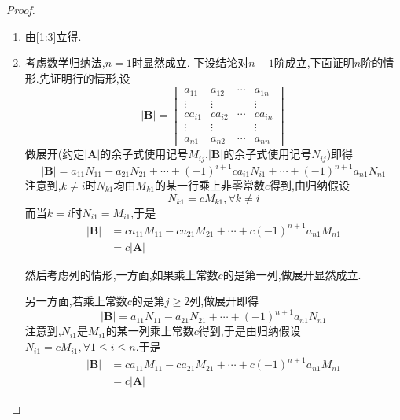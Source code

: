 {\begin{proof}
\begin{enumerate}[label = {\textup{(\arabic*)}}]
                  因为$\left|\bm{A}\right|$是下三角行列式即$a_{ij}=0,\forall i<j$,所以$M_{k1},\forall 1\leqslant k\leqslant n$均是下三角行列式并且断言$k\geqslant 2$时$M_{k1}$必定有零主对角元.事实上,$b_{k-1,k-1}=a_{k-1,k}=0$即得.于是由归纳假设$M_{k1}=0,\forall k\geqslant 2,M_{11}=a_{22}\cdots a_{nn}\Longrightarrow \left|\bm{A}\right|=a_{11}a_{22}\cdots a_{nn}.$证毕.
            \item 由\ref{1:3}立得.
            \item 考虑数学归纳法,$n=1$时显然成立.
                  下设结论对$n-1$阶成立,下面证明$n$阶的情形.先证明行的情形,设
                  \[
                      \left|\bm{B}\right|=\begin{vmatrix}
                          a_{11}  & a_{12}  & \cdots & a_{1n}  \\
                          \vdots  & \vdots  &        & \vdots  \\
                          ca_{i1} & ca_{i2} & \cdots & ca_{in} \\
                          \vdots  & \vdots  &        & \vdots  \\
                          a_{n1}  & a_{n2}  & \cdots & a_{nn}
                      \end{vmatrix}
                  \]做展开(约定$\left|\bm{A}\right|$的余子式使用记号$M_{ij}$,$\left|\bm{B}\right|$的余子式使用记号$N_{ij}$)即得\[
                      \left|\bm{B}\right|=a_{11}N_{11}-a_{21}N_{21}+\cdots+(-1)^{i+1}ca_{i1}N_{i1}+\cdots+(-1)^{n+1}a_{n1}N_{n1}
                  \]注意到,$k\neq i$时$N_{k1}$均由$M_{k1}$的某一行乘上非零常数$c$得到,由归纳假设\[N_{k1}=cM_{k1},\forall k\neq i\]而当$k=i$时$N_{i1}=M_{i1}$,于是\begin{align*}
                      \left|\bm{B}\right| & =ca_{11}M_{11}-ca_{21}M_{21}+\cdots+c(-1)^{n+1}a_{n1}M_{n1} \\
                                          & =c\left|\bm{A}\right|
                  \end{align*}

                  然后考虑列的情形,一方面,如果乘上常数$c$的是第一列,做展开显然成立.

                  另一方面,若乘上常数$c$的是第$j\geqslant 2$列,做展开即得\[
                      \left|\bm{B}\right|=a_{11}N_{11}-a_{21}N_{21}+\cdots+(-1)^{n+1}a_{n1}N_{n1}
                  \]注意到,$N_{i1}$是$M_{i1}$的某一列乘上常数$c$得到,于是由归纳假设$N_{i1}=cM_{i1},\forall 1\leqslant i\leqslant n.$于是\begin{align*}
                      \left|\bm{B}\right| & =ca_{11}M_{11}-ca_{21}M_{21}+\cdots+c(-1)^{n+1}a_{n1}M_{n1} \\
                                          & =c\left|\bm{A}\right|
                  \end{align*}


\end{enumerate}
\end{proof}}

